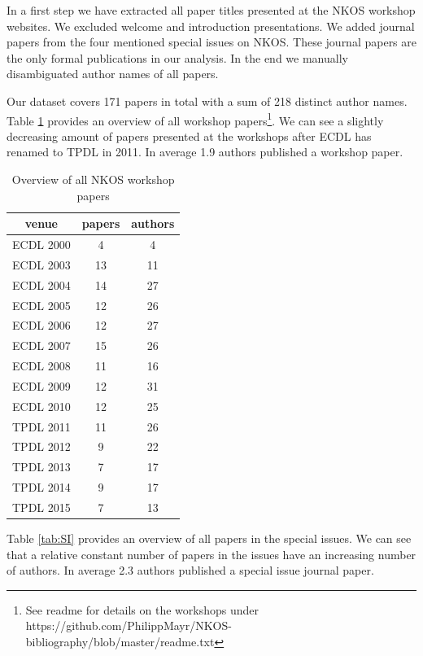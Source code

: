 \documentclass[runningheads,a4paper]{llncs}
\begin{document}
In a first step we have extracted all paper titles presented at the NKOS workshop websites. We excluded welcome and introduction presentations. We added journal papers from the four mentioned special issues on NKOS. These journal papers are the only formal publications in our analysis. In the end we manually disambiguated author names of all papers.

Our dataset covers 171 papers in total with a sum of 218 distinct author names. Table \ref{tab:workshops} provides an overview of all workshop papers\footnote{See readme for details on the workshops under https://github.com/PhilippMayr/NKOS-bibliography/blob/master/readme.txt}. We can see a slightly decreasing amount of papers presented at the workshops after ECDL has renamed to TPDL in 2011. In average 1.9 authors published a workshop paper.

\begin{table}
	\centering
	\caption{Overview of all NKOS workshop papers}
\begin{tabular}	{|c|c|c|}		
	\hline 
	venue& papers  & authors  \\ 
	\hline 
	ECDL 2000& 4 & 4 \\ 
	\hline 
	ECDL 2003& 13 & 11 \\ 
	\hline 
	ECDL 2004& 14 & 27 \\ 
	\hline 
	ECDL 2005& 12 & 26 \\ 
	\hline 
	ECDL 2006& 12 & 27 \\ 
	\hline 
	ECDL 2007& 15 & 26 \\ 
	\hline 
	ECDL 2008& 11 & 16 \\ 
	\hline 
	ECDL 2009& 12 & 31 \\ 
	\hline 
	ECDL 2010& 12 & 25 \\ 
	\hline 
	TPDL 2011& 11 & 26 \\ 
	\hline 
	TPDL 2012& 9 & 22 \\ 
	\hline 
	TPDL 2013& 7 & 17 \\ 
	\hline 
	TPDL 2014& 9 & 17 \\ 
	\hline 
	TPDL 2015& 7 & 13 \\ 
	\hline 
\end{tabular} 
\label{tab:workshops}
\end{table}

Table \ref{tab:SI} provides an overview of all papers in the special issues. We can see that a relative constant number of papers in the issues have an increasing number of authors. In average 2.3 authors published a special issue journal paper.
\end{document}

